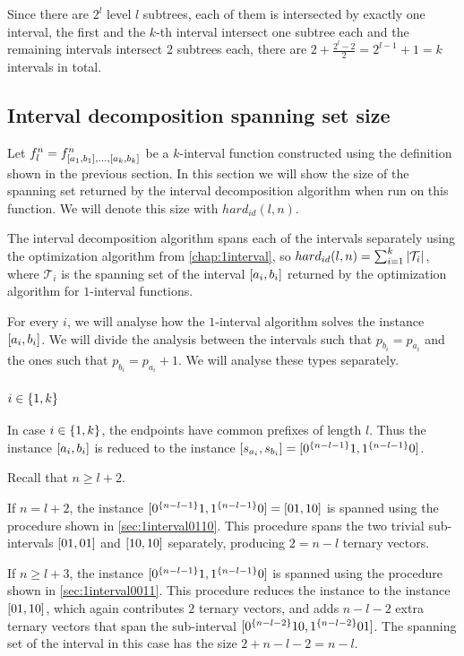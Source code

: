 Since there are $2^l$ level $l$ subtrees,
each of them is intersected by exactly one interval,
the first and the $k$-th interval intersect
one subtree each
and the remaining intervals intersect 2 subtrees each,
there are $2 + \frac{2^l - 2}{2} = 2^{l-1} + 1 = k$
intervals in total.

\subsection{Interval decomposition spanning set size}

Let $f_l^n =
f^n_{[a_1, b_1], \ldots, [a_k, b_k]}$
be a $k$-interval function
constructed using the definition
shown in the previous section.
In this section we will show the size of the spanning set
returned by the interval decomposition algorithm
when run on this function.
We will denote this size with $hard_{id}(l, n)$.

The interval decomposition algorithm spans
each of the intervals separately
using the optimization algorithm
from \autoref{chap:1interval},
so $hard_{id}(l, n) = \sum_{i=1}^k{\lvert\mathcal{T}_i\rvert}$,
where $\mathcal{T}_i$ is the spanning set
of the interval $[a_i, b_i]$
returned by the optimization algorithm
for $1$-interval functions.

For every $i$,
we will analyse how the $1$-interval algorithm solves
the instance $[a_i, b_i]$.
We will divide the analysis between the intervals
such that $p_{b_i} = p_{a_i}$
and the ones such that $p_{b_i} = p_{a_i} + 1$.
We will analyse these types separately.

\subsubsection{$i \in \{1, k\}$}

In case $i \in \{1, k\}$,
the endpoints have common prefixes of length $l$.
Thus the instance $[a_i, b_i]$
is reduced to the instance
$[s_{a_i}, s_{b_i}]
= [0^{\{n-l-1\}} 1, 1^{\{n-l-1\}} 0]$.

Recall that $n \geq l + 2$.

If $n = l + 2$,
the instance
$[0^{\{n-l-1\}} 1, 1^{\{n-l-1\}} 0]
= [01, 10]$
is spanned using the procedure
shown in \autoref{sec:1interval0110}.
This procedure spans the two trivial sub-intervals
$[01, 01]$ and $[10, 10]$
separately,
producing $2 = n-l$ ternary vectors.

If $n \geq l + 3$,
the instance
$[0^{\{n-l-1\}} 1, 1^{\{n-l-1\}} 0]$
is spanned using the procedure
shown in \autoref{sec:1interval0011}.
This procedure reduces the instance
to the instance $[01, 10]$,
which again contributes $2$ ternary vectors,
and adds $n-l-2$ extra ternary vectors
that span the sub-interval
$[0^{\{n-l-2\}} 10, 1^{\{n-l-2\}} 01]$.
The spanning set of the interval in this case has the size
$2 + n - l - 2 = n - l$.

